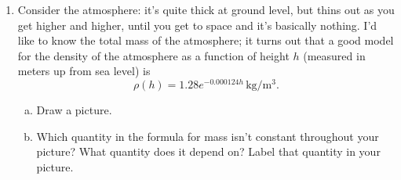 \documentclass[12pt]{article}
\newenvironment{red}{\color{red}}{\ignorespacesafterend}
\begin{document}
\begin{enumerate}
\begin{enumerate}[(a)]
    \begin{red}
        The issue is that force is a nonconstant function of distance, $F(x)$.
    \end{red}
    \item Draw a representative small slice where that quantity is approximately constant. Label that slice with a \(\Delta\)\rule{0.5cm}{0.15mm}.
    \item Write an equation for \(\Delta E\) for that slice.
    \begin{red}
        \[\Delta E = F(x)\cdot d =  \frac{k}{x^2}\cdot\Delta x\]
    \end{red}
    \item Write a definite integral that gives the total energy \(E\) needed to push the magnet from 5 cm away to 3 cm away. 
    \begin{red}
        \[E_{total} = \int_{0.03}^{0.05} \frac{k}{x^2}\,dx\]
    \end{red}
    \item Evaluate the integral, assign it the proper units, and explain the meaning of your result. Your answer will involve the constant \(k\), which we don't have enough information to figure out. (What information would we need?)
    \begin{red}
        \[E_{total} = \int_{0.03}^{0.05} \frac{k}{x^2}\,dx = \frac{-k}{x}\bigg|_{0.03}^{0.05} = k\cdot\SI{13.33}{J}\]
        So, it takes 13.33$k$ J (not to be confused with 13.33 kilojoules!) to move the magnet this distance.
    \end{red}
    \item Describe the meaning of each factor of your integral, and give its units.
    \begin{red}
        \[\int_{0.03}^{0.05} \underbrace{ \underbrace{\frac{k}{x^2}}_{\text{Force required to move magnet at distance \(x\) (N)}\quad } \underbrace{dx}_{\text{Distance moved (m)} } }_{ \text{Energy required to move the magnet a distance \(dx\) when the magnets are \(x\) m apart (J)} }\]
    \end{red}
\end{enumerate}

\item Consider the atmosphere: it's quite thick at ground level, but thins out as you get higher and higher, until you get to space and it's basically nothing. I'd like to know the total mass of the atmosphere; it turns out that a good model for the density of the atmosphere as a function of height \(h\) (measured in meters up from sea level) is
\[ \rho(h) = 1.28 e^{-0.000124 h}\, \unit{\kg/\m^3}.\]
\begin{enumerate}[(a)]
    \item Draw a picture.
    \item Which quantity in the formula for mass isn't constant throughout your picture? What quantity does it depend on? Label that quantity in your picture.
    

\end{enumerate}
\end{enumerate}
\end{document}
